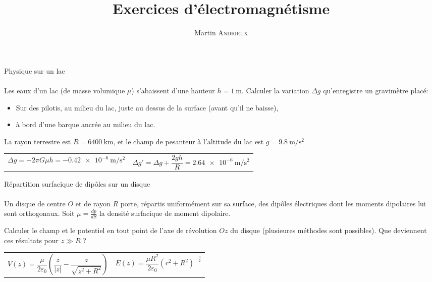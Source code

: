 \documentclass[french, a4paper, 11pt]{article}
\title{Exercices d'électromagnétisme}
\author{Martin \textsc{Andrieux}}
\date{}
\newcommand{\po}{\left(}         %
\newcommand{\pf}{\right)}        %
\newcommand{\pof}[1]{\po #1 \pf} %
\begin{document}
\maketitle

\begin{cadre}{Physique sur un lac}
  \paragraph*{}
  Les eaux d'un lac (de masse volumique $\mu$) s'abaissent d'une hauteur $h=\SI{1}{\meter}$. Calculer la variation $\Delta g$ qu'enregistre un gravimètre placé:
  \begin{itemize}[label=$\bullet$]
    \item Sur des pilotis, au milieu du lac, juste au dessus de la surface (avant qu'il ne baisse),
    \item à bord d'une barque ancrée au milieu du lac.
  \end{itemize}
  La rayon terrestre est $R=\SI{6400}{\kilo\meter}$, et le champ de pesanteur à l'altitude du lac est $g=\SI{9,8}{\meter\per\square\second}$
  \tcblower
  \begin{tabularx}{\linewidth}{Xr}
    $\Delta g = -2\pi G\mu h = \SI{-0.42e-6}{\meter\per\square\second}$&
    $\Delta g' = \Delta g + \dfrac{2gh}{R} = \SI{2.64e-6}{\meter\per\square\second}$
  \end{tabularx}
\end{cadre}

\begin{cadre}{Répartition surfacique de dipôles sur un disque}
  \paragraph*{}
  Un disque de centre $O$ et de rayon $R$ porte, répartis uniformément sur sa surface, des dipôles électriques dont les moments dipolaires lui sont orthogonaux. Soit $\mu = \frac{dp}{dS}$ la densité surfacique de moment dipolaire.

  Calculer le champ et le potentiel en tout point de l'axe de révolution $Oz$ du disque (plusieures méthodes sont possibles). Que deviennent ces résultats pour $z\gg R$ ?
  \tcblower
  \begin{tabularx}{\linewidth}{Xr}
    $V(z) = \dfrac{\mu}{2\varepsilon_{0}}\pof{\dfrac{z}{\lvert z\rvert}-\dfrac{z}{\sqrt{z^{2}+R^{2}}}}$ &
    $E(z) = \dfrac{\mu R^{2}}{2\varepsilon_{0}}\pof{r^{2}+R^{2}}^{-\frac{3}{2}}$
  \end{tabularx}
\end{cadre}
\end{document}
